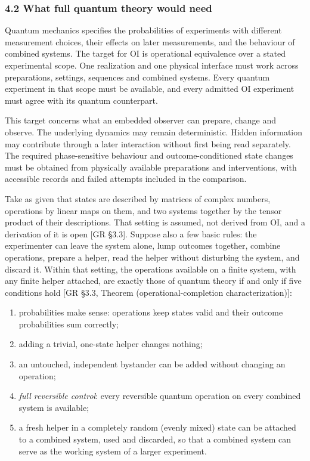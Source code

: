\documentclass[
]{article}
\providecommand{\tightlist}{%
  \setlength{\itemsep}{0pt}\setlength{\parskip}{0pt}}
\begin{document}
\hypertarget{what-full-quantum-theory-would-need}{%
\subsubsection{4.2 What full quantum theory would
need}\label{what-full-quantum-theory-would-need}}

Quantum mechanics specifies the probabilities of experiments with
different measurement choices, their effects on later measurements, and
the behaviour of combined systems. The target for OI is operational
equivalence over a stated experimental scope. One realization and one
physical interface must work across preparations, settings, sequences
and combined systems. Every quantum experiment in that scope must be
available, and every admitted OI experiment must agree with its quantum
counterpart.

This target concerns what an embedded observer can prepare, change and
observe. The underlying dynamics may remain deterministic. Hidden
information may contribute through a later interaction without first
being read separately. The required phase-sensitive behaviour and
outcome-conditioned state changes must be obtained from physically
available preparations and interventions, with accessible records and
failed attempts included in the comparison.

Take as given that states are described by matrices of complex numbers,
operations by linear maps on them, and two systems together by the
tensor product of their descriptions. That setting is assumed, not
derived from OI, and a derivation of it is open {[}GR §3.3{]}. Suppose
also a few basic rules: the experimenter can leave the system alone,
lump outcomes together, combine operations, prepare a helper, read the
helper without disturbing the system, and discard it. Within that
setting, the operations available on a finite system, with any finite
helper attached, are exactly those of quantum theory if and only if five
conditions hold {[}GR §3.3, Theorem (operational-completion
characterization){]}:

\begin{enumerate}
\def\labelenumi{\arabic{enumi}.}
\tightlist
\item
  probabilities make sense: operations keep states valid and their
  outcome probabilities sum correctly;
\item
  adding a trivial, one-state helper changes nothing;
\item
  an untouched, independent bystander can be added without changing an
  operation;
\item
  \emph{full reversible control}: every reversible quantum operation on
  every combined system is available;
\item
  a fresh helper in a completely random (evenly mixed) state can be
  attached to a combined system, used and discarded, so that a combined
  system can serve as the working system of a larger experiment.
\end{enumerate}
\end{document}
